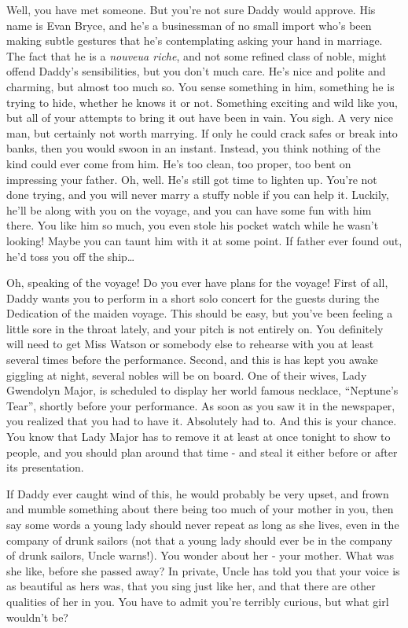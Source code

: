 \documentclass[char]{airship}
\begin{document}
Well, you have met someone. But you're not sure Daddy would
approve. His name is Evan Bryce, and he's a businessman of no small
import who's been making subtle gestures that he's contemplating
asking your hand in marriage. The fact that he is a {\it nouveua
riche}, and not some refined class of noble, might offend Daddy's
sensibilities, but you don't much care. He's nice and polite and
charming, but almost too much so. You sense something in him,
something he is trying to hide, whether he knows it or not. Something
exciting and wild like you, but all of your attempts to bring it out
have been in vain. You sigh. A very nice man, but certainly not worth
marrying. If only he could crack safes or break into banks, then you
would swoon in an instant. Instead, you think nothing of the kind
could ever come from him. He's too clean, too proper, too bent on
impressing your father. Oh, well. He's still got time to lighten
up. You're not done trying, and you will never marry a stuffy noble if
you can help it. Luckily, he'll be along with you on the voyage, and
you can have some fun with him there. You like him so much, you even stole his pocket watch while he wasn't looking! Maybe you can taunt him with it at some point. If father ever found out, he'd toss you off the ship{\ldots}

Oh, speaking of the voyage! Do you ever have plans for the voyage!
First of all, Daddy wants you to perform in a short solo concert for
the guests during the Dedication of the maiden voyage. This should
be easy, but you've been feeling a little sore in the throat lately,
and your pitch is not entirely on. You definitely will need to get
Miss Watson or somebody else to rehearse with you at least several
times before the performance. Second, and this is has kept you awake
giggling at night, several nobles will be on board. One of their
wives, Lady Gwendolyn Major, is scheduled to display her world famous
necklace, ``Neptune's Tear'', shortly before your performance. As soon
as you saw it in the newspaper, you realized that you had to have
it. Absolutely had to. And this is your chance. You know that Lady
Major has to remove it at least at once tonight to show to people, and
you should plan around that time - and steal it either before or after
its presentation.

If Daddy ever caught wind of this, he would probably be very upset,
and frown and mumble something about there being too much of your
mother in you, then say some words a young lady should never repeat as
long as she lives, even in the company of drunk sailors (not that a
young lady should ever be in the company of drunk sailors, Uncle
warns!). You wonder about her - your mother. What was she like, before
she passed away? In private, Uncle has told you that your voice is as
beautiful as hers was, that you sing just like her, and that there are
other qualities of her in you. You have to admit you're terribly
curious, but what girl wouldn't be? 
\end{document}
